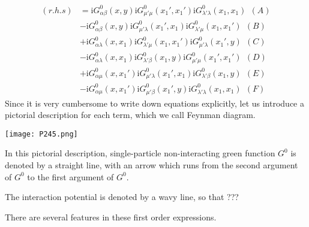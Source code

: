 \begin{align} \label{2.5.2}
(r.h.s)&=\mathrm{i}G_{\alpha\beta}^0(x,y)\mathrm{i}G^0_{\mu'\mu}(x_1',x_1')\mathrm{i}G^0_{\lambda'\lambda}(x_1,x_1) \ \ (A)\nonumber\\ 
&-\mathrm{i}G_{\alpha\beta}^0(x,y)\mathrm{i}G^0_{\mu'\lambda}(x_1',x_1)\mathrm{i}G^0_{\lambda'\mu}(x_1,x_1') \ \ (B)\nonumber \\
&+\mathrm{i}G_{\alpha\lambda}^0(x,x_1)\mathrm{i}G^0_{\lambda'\mu}(x_1,x_1')\mathrm{i}G^0_{\mu'\lambda}(x_1',y) \ \ (C)\nonumber \\
&-\mathrm{i}G_{\alpha\lambda}^0(x,x_1)\mathrm{i}G^0_{\lambda'\beta}(x_1,y)\mathrm{i}G^0_{\mu'\mu}(x_1',x_1') \ \ (D)\nonumber \\
&+\mathrm{i}G_{\alpha\mu}^0(x,x_1')\mathrm{i}G^0_{\mu'\lambda}(x_1',x_1)\mathrm{i}G^0_{\lambda'\beta}(x_1,y) \ \ (E)\nonumber \\
&-\mathrm{i}G_{\alpha\mu}^0(x,x_1')\mathrm{i}G^0_{\mu'\beta}(x_1',y)\mathrm{i}G^0_{\lambda'\lambda}(x_1,x_1) \ \ (F)
\end{align}
Since it is very cumbersome to write down equations explicitly, let us introduce a pictorial description for each term, which we call Feynman diagram.
\begin{center}
\texttt{[image: P245.png]}
\end{center}
In this pictorial description, single-particle non-interacting green function $G^0$ is denoted by a straight line, with an arrow which runs from the second argument of $G^0$ to the first argument of $G^0$.

The interaction potential is denoted by a wavy line, so that ???

	There are several features in these first order expressions.

